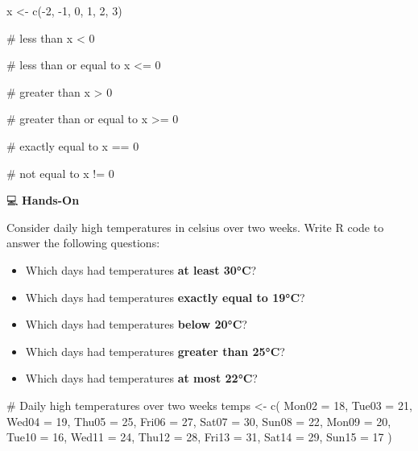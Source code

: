 \documentclass[
  letterpaper,
  DIV=11,
  numbers=noendperiod]{scrreprt}
\newenvironment{Shaded}{\begin{snugshade}}{\end{snugshade}}
\newcommand{\AttributeTok}[1]{\textcolor[rgb]{0.40,0.45,0.13}{#1}}
\newcommand{\CommentTok}[1]{\textcolor[rgb]{0.37,0.37,0.37}{#1}}
\newcommand{\DecValTok}[1]{\textcolor[rgb]{0.68,0.00,0.00}{#1}}
\newcommand{\FunctionTok}[1]{\textcolor[rgb]{0.28,0.35,0.67}{#1}}
\newcommand{\NormalTok}[1]{\textcolor[rgb]{0.00,0.23,0.31}{#1}}
\newcommand{\OtherTok}[1]{\textcolor[rgb]{0.00,0.23,0.31}{#1}}
\newcommand{\SpecialCharTok}[1]{\textcolor[rgb]{0.37,0.37,0.37}{#1}}
\begin{document}
\begin{Shaded}
\begin{Highlighting}[]
\NormalTok{x }\OtherTok{\textless{}{-}} \FunctionTok{c}\NormalTok{(}\SpecialCharTok{{-}}\DecValTok{2}\NormalTok{, }\SpecialCharTok{{-}}\DecValTok{1}\NormalTok{, }\DecValTok{0}\NormalTok{, }\DecValTok{1}\NormalTok{, }\DecValTok{2}\NormalTok{, }\DecValTok{3}\NormalTok{)}

\CommentTok{\# less than}
\NormalTok{x }\SpecialCharTok{\textless{}} \DecValTok{0}     

\CommentTok{\# less than or equal to}
\NormalTok{x }\SpecialCharTok{\textless{}=} \DecValTok{0}    

\CommentTok{\# greater than}
\NormalTok{x }\SpecialCharTok{\textgreater{}} \DecValTok{0}     

\CommentTok{\# greater than or equal to}
\NormalTok{x }\SpecialCharTok{\textgreater{}=} \DecValTok{0}    

\CommentTok{\# exactly equal to}
\NormalTok{x }\SpecialCharTok{==} \DecValTok{0}    
 
\CommentTok{\# not equal to}
\NormalTok{x }\SpecialCharTok{!=} \DecValTok{0}    
\end{Highlighting}
\end{Shaded}

💻 \textbf{Hands-On}

Consider daily high temperatures in celsius over two weeks. Write R code
to answer the following questions:

\begin{itemize}
\item
  Which days had temperatures \textbf{at least 30°C}?
\item
  Which days had temperatures \textbf{exactly equal to 19°C}?
\item
  Which days had temperatures \textbf{below 20°C}?
\item
  Which days had temperatures \textbf{greater than 25°C}?
\item
  Which days had temperatures \textbf{at most 22°C}?
\end{itemize}

\begin{Shaded}
\begin{Highlighting}[]
\CommentTok{\# Daily high temperatures over two weeks}
\NormalTok{temps }\OtherTok{\textless{}{-}} \FunctionTok{c}\NormalTok{(}
  \AttributeTok{Mon02 =} \DecValTok{18}\NormalTok{, }\AttributeTok{Tue03 =} \DecValTok{21}\NormalTok{, }\AttributeTok{Wed04 =} \DecValTok{19}\NormalTok{, }\AttributeTok{Thu05 =} \DecValTok{25}\NormalTok{, }\AttributeTok{Fri06 =} \DecValTok{27}\NormalTok{, }\AttributeTok{Sat07 =} \DecValTok{30}\NormalTok{, }\AttributeTok{Sun08 =} \DecValTok{22}\NormalTok{, }
  \AttributeTok{Mon09 =} \DecValTok{20}\NormalTok{, }\AttributeTok{Tue10 =} \DecValTok{16}\NormalTok{, }\AttributeTok{Wed11 =} \DecValTok{24}\NormalTok{, }\AttributeTok{Thu12 =} \DecValTok{28}\NormalTok{, }\AttributeTok{Fri13 =} \DecValTok{31}\NormalTok{, }\AttributeTok{Sat14 =} \DecValTok{29}\NormalTok{, }\AttributeTok{Sun15 =} \DecValTok{17}
\NormalTok{)}
\end{Highlighting}
\end{Shaded}
\end{document}
